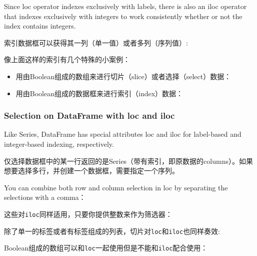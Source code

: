 Since loc operator indexes exclusively with labels, there is also an iloc operator that indexes exclusively with integers to work consistently whether or not the index contains integers.




索引数据框可以获得其一列（单一值）或者多列（序列值）:

像上面这样的索引有几个特殊的小案例：
\begin{itemize}
    \item 用由Boolean组成的数组来进行切片（slice）或者选择（select）数据：
    \item 用由Boolean组成的数据框来进行索引（index）数据：
\end{itemize}
\subsubsection{Selection on DataFrame with loc and iloc}
Like Series, DataFrame has special attributes loc and iloc for label-based and integer-based indexing, respectively.

仅选择数据框中的某一行返回的是Series（带有索引，即原数据的columns）。如果想要选择多行，并创建一个数据框，需要指定一个序列。


You can combine both row and column selection in loc by separating the selections with a comma：

这些对\verb|iloc|同样适用，只要你提供整数来作为筛选器：

除了单一的标签或者有标签组成的列表，切片对\verb|loc|和\verb|iloc|也同样奏效:

Boolean组成的数组可以和\verb|loc|一起使用但是不能和\verb|iloc|配合使用：

